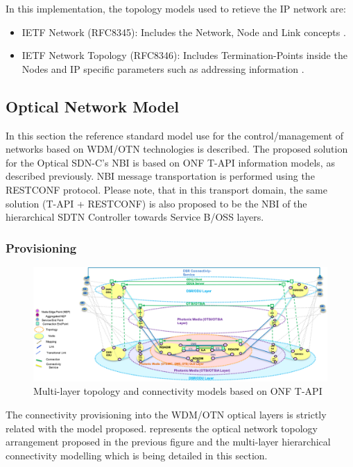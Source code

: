 \documentclass[a4paper,fleqn]{cas-dc}
\begin{document}
In this implementation, the topology models used to retieve the IP network are: 
\begin{itemize}
\item IETF Network (RFC8345): Includes the Network, Node and Link concepts \cite{clemm2018yang}.
\item IETF Network Topology (RFC8346): Includes Termination-Points inside the Nodes and IP specific parameters such as addressing information \cite{varga2018internet}.
\end{itemize}

\subsection{Optical Network Model}
\label{section:OPTmodels}

In this section the reference standard model use for the control/management of networks based on WDM/OTN technologies is described. The proposed solution for the Optical SDN-C's NBI is based on ONF T-API information models, as described previously.  NBI message transportation is performed using the RESTCONF protocol. Please note, that in this transport domain, the same solution (T-API + RESTCONF) is also proposed to be the NBI of the hierarchical SDTN Controller towards Service B/OSS layers.

\subsubsection{Provisioning}

\begin{figure}
	\centering
		\includegraphics[scale=0.8]{figs/ONF-T-API.png}
	\caption{Multi-layer topology and connectivity models based on ONF T-API}
	\label{FIG:ONF-T-API}
\end{figure}

The connectivity provisioning into the WDM/OTN optical layers is strictly related with the model proposed.  represents the optical network topology arrangement proposed in the previous figure and the multi-layer hierarchical connectivity modelling which is being detailed in this section.
\end{document}
